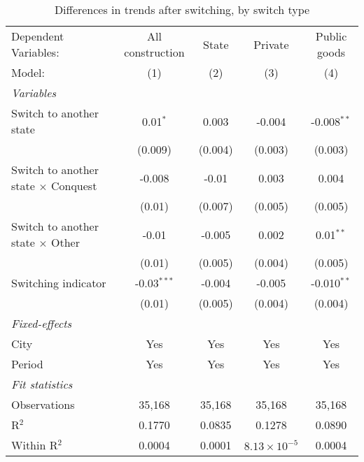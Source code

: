 \begin{table}[htbp]
   \caption{\label{tab:window_10y} Differences in trends after switching, by switch type}
   \centering
   \begin{tabular}{lcccc}
      \tabularnewline \midrule \midrule
      Dependent Variables:                       & All construction & State   & Private               & Public goods\\  
      Model:                                     & (1)              & (2)     & (3)                   & (4)\\  
      \midrule
      \emph{Variables}\\
      Switch to another state                    & 0.01$^{*}$       & 0.003   & -0.004                & -0.008$^{**}$\\   
                                                 & (0.009)          & (0.004) & (0.003)               & (0.003)\\   
      Switch to another state $\times$ Conquest  & -0.008           & -0.01   & 0.003                 & 0.004\\   
                                                 & (0.01)           & (0.007) & (0.005)               & (0.005)\\   
      Switch to another state $\times$ Other     & -0.01            & -0.005  & 0.002                 & 0.01$^{**}$\\   
                                                 & (0.01)           & (0.005) & (0.004)               & (0.005)\\   
      Switching indicator                        & -0.03$^{***}$    & -0.004  & -0.005                & -0.010$^{**}$\\   
                                                 & (0.01)           & (0.005) & (0.004)               & (0.004)\\   
      \midrule
      \emph{Fixed-effects}\\
      City                                       & Yes              & Yes     & Yes                   & Yes\\  
      Period                                     & Yes              & Yes     & Yes                   & Yes\\  
      \midrule
      \emph{Fit statistics}\\
      Observations                               & 35,168           & 35,168  & 35,168                & 35,168\\  
      R$^2$                                      & 0.1770           & 0.0835  & 0.1278                & 0.0890\\  
      Within R$^2$                               & 0.0004           & 0.0001  & $8.13\times 10^{-5}$  & 0.0004\\  
      \midrule \midrule
      

\end{tabular}
\end{table}
